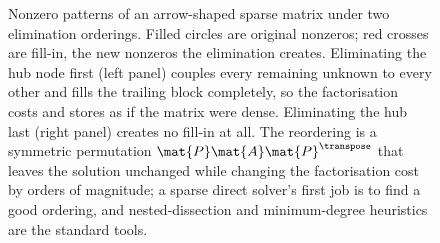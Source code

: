 \begin{figure}[ht]
\begin{tikzpicture}[x=1.0cm, y=1.0cm, font=\small]
\end{tikzpicture}
\caption[Fill-in depends on elimination order]{Nonzero patterns of an
arrow-shaped sparse matrix under two elimination orderings. Filled
circles are original nonzeros; red crosses are fill-in, the new nonzeros
the elimination creates. Eliminating the hub node first (left panel)
couples every remaining unknown to every other and fills the trailing
block completely, so the factorisation costs and stores as if the matrix
were dense. Eliminating the hub last (right panel) creates no fill-in at
all. The reordering is a symmetric permutation
$\mat{P}\mat{A}\mat{P}^{\transpose}$ that leaves the solution unchanged
while changing the factorisation cost by orders of magnitude; a sparse
direct solver's first job is to find a good ordering, and
nested-dissection and minimum-degree heuristics are the standard tools.}
\label{fig:vol02:ch09:fillin-reordering}
\end{figure}
